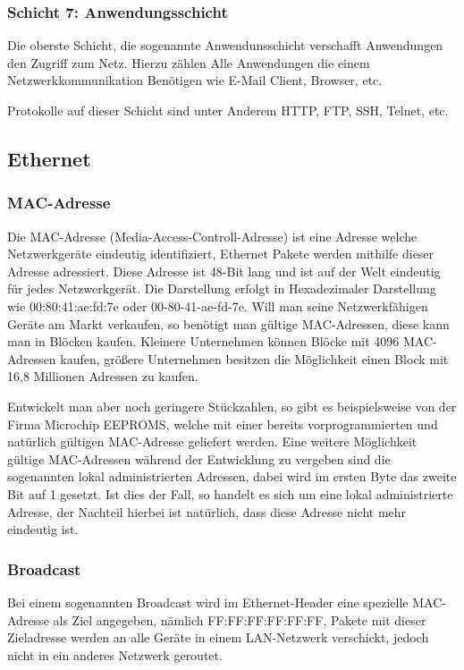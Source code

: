 \documentclass[a4paper,14pt,headsepline]{scrartcl}
\begin{document}
\subsubsection{Schicht 7: Anwendungsschicht}
Die oberste Schicht, die sogenannte Anwendunsschicht verschafft Anwendungen den Zugriff zum Netz. Hierzu zählen Alle Anwendungen die einem Netzwerkkommunikation Benötigen wie E-Mail Client, Browser, etc.

Protokolle auf dieser Schicht sind unter Anderem HTTP, FTP, SSH, Telnet, etc.
 
\subsection{Ethernet}


\subsubsection{MAC-Adresse}
Die MAC-Adresse (Media-Access-Controll-Adresse) ist eine Adresse welche Netzwerkgeräte eindeutig identifiziert, Ethernet Pakete werden mithilfe dieser Adresse adressiert. Diese Adresse ist 48-Bit lang und ist auf der Welt eindeutig für jedes Netzwerkgerät. Die Darstellung erfolgt in Hexadezimaler Darstellung wie 00:80:41:ae:fd:7e oder 00-80-41-ae-fd-7e. Will man seine Netzwerkfähigen Geräte am Markt verkaufen, so benötigt man gültige MAC-Adressen, diese kann man in Blöcken kaufen. Kleinere Unternehmen können Blöcke mit 4096 MAC-Adressen kaufen, größere Unternehmen besitzen die Möglichkeit einen Block mit 16,8 Millionen Adressen zu kaufen.

Entwickelt man aber noch geringere Stückzahlen, so gibt es beispielsweise von der Firma Microchip EEPROMS, welche mit einer bereits vorprogrammierten und natürlich gültigen MAC-Adresse geliefert werden. Eine weitere Möglichkeit gültige MAC-Adressen während der Entwicklung zu vergeben sind die sogenannten lokal administrierten Adressen, dabei wird im ersten Byte das zweite Bit auf 1 gesetzt. Ist dies der Fall, so handelt es sich um eine lokal administrierte Adresse, der Nachteil hierbei ist natürlich, dass diese Adresse nicht mehr eindeutig ist.

\subsubsection{Broadcast}
Bei einem sogenannten Broadcast wird im Ethernet-Header eine spezielle MAC-Adresse als Ziel angegeben, nämlich FF:FF:FF:FF:FF:FF, Pakete mit dieser Zieladresse werden an alle Geräte in einem LAN-Netzwerk verschickt, jedoch nicht in ein anderes Netzwerk geroutet.
\end{document}
